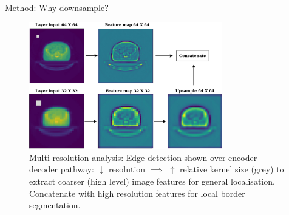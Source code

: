 \documentclass[9pt]{beamer}
\begin{document}

\begin{frame}{Method: Why downsample?}
\begin{figure}
	\includegraphics[width=0.75\textwidth]{images/downsampling}
	\caption{Multi-resolution analysis: Edge detection shown over encoder-decoder pathway: $\downarrow$ resolution $\implies$ $\uparrow$ relative kernel size (grey) to extract coarser (high level) image features for general localisation. Concatenate with high resolution features for local border segmentation.\footnotemark[6]}
\end{figure}
\end{frame}
%
%
%
%
%
%
%
%
\end{document}
